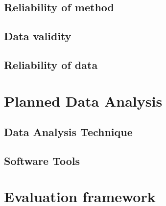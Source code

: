 
\subsection{Reliability of method}
\label{sec:reliabilityOfMethod}

\subsection{Data validity}
\label{sec:dataValidity}

\subsection{Reliability of data}
\label{sec:reliabilityOfData}


\section{Planned Data Analysis}
\label{sec:plannedDataAnalysis}


\subsection{Data Analysis Technique}
\label{sec:dataAnalysisTechnique}

\subsection{Software Tools}
\label{sec:softwareTools}


\section{Evaluation framework}
\label{sec:evaluationFramework}

